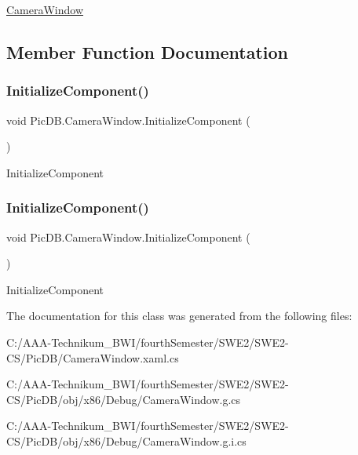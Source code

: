 \mbox{\hyperlink{class_pic_d_b_1_1_camera_window}{Camera\+Window}} 

\subsection{Member Function Documentation}
\mbox{\label{class_pic_d_b_1_1_camera_window_a0f76da75ec227a474e47daa78d549653}} 
\subsubsection{\texorpdfstring{Initialize\+Component()}{InitializeComponent()}\hspace{0.1cm}{\footnotesize\ttfamily [1/2]}}
{\footnotesize\ttfamily void Pic\+D\+B.\+Camera\+Window.\+Initialize\+Component (\begin{DoxyParamCaption}{ }\end{DoxyParamCaption})}



Initialize\+Component 

\mbox{\label{class_pic_d_b_1_1_camera_window_a0f76da75ec227a474e47daa78d549653}} 
\subsubsection{\texorpdfstring{Initialize\+Component()}{InitializeComponent()}\hspace{0.1cm}{\footnotesize\ttfamily [2/2]}}
{\footnotesize\ttfamily void Pic\+D\+B.\+Camera\+Window.\+Initialize\+Component (\begin{DoxyParamCaption}{ }\end{DoxyParamCaption})}



Initialize\+Component 



The documentation for this class was generated from the following files\+:\begin{DoxyCompactItemize}
\item 
C\+:/\+A\+A\+A-\/\+Technikum\+\_\+\+B\+W\+I/fourth\+Semester/\+S\+W\+E2/\+S\+W\+E2-\/\+C\+S/\+Pic\+D\+B/Camera\+Window.\+xaml.\+cs\item 
C\+:/\+A\+A\+A-\/\+Technikum\+\_\+\+B\+W\+I/fourth\+Semester/\+S\+W\+E2/\+S\+W\+E2-\/\+C\+S/\+Pic\+D\+B/obj/x86/\+Debug/Camera\+Window.\+g.\+cs\item 
C\+:/\+A\+A\+A-\/\+Technikum\+\_\+\+B\+W\+I/fourth\+Semester/\+S\+W\+E2/\+S\+W\+E2-\/\+C\+S/\+Pic\+D\+B/obj/x86/\+Debug/Camera\+Window.\+g.\+i.\+cs\end{DoxyCompactItemize}
